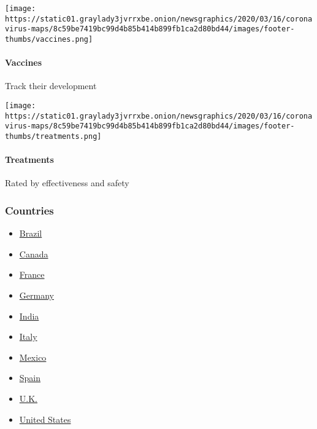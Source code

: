\texttt{[image: https://static01.graylady3jvrrxbe.onion/newsgraphics/2020/03/16/coronavirus-maps/8c59be7419bc99d4b85b414b899fb1ca2d80bd44/images/footer-thumbs/vaccines.png]}

\hypertarget{vaccines}{%
\paragraph{Vaccines}\label{vaccines}}

Track their development

\href{https://www.nytimes3xbfgragh.onion/interactive/2020/science/coronavirus-drugs-treatments.html}{}

\texttt{[image: https://static01.graylady3jvrrxbe.onion/newsgraphics/2020/03/16/coronavirus-maps/8c59be7419bc99d4b85b414b899fb1ca2d80bd44/images/footer-thumbs/treatments.png]}

\hypertarget{treatments}{%
\paragraph{Treatments}\label{treatments}}

Rated by effectiveness and safety

\hypertarget{countries}{%
\subsubsection{Countries}\label{countries}}

\begin{itemize}
\tightlist
\item
  \href{https://www.nytimes3xbfgragh.onion/interactive/2020/world/americas/brazil-coronavirus-cases.html}{Brazil}
\item
  \href{https://www.nytimes3xbfgragh.onion/interactive/2020/world/canada/canada-coronavirus-cases.html}{Canada}
\item
  \href{https://www.nytimes3xbfgragh.onion/interactive/2020/world/europe/france-coronavirus-cases.html}{France}
\item
  \href{https://www.nytimes3xbfgragh.onion/interactive/2020/world/europe/germany-coronavirus-cases.html}{Germany}
\item
  \href{https://www.nytimes3xbfgragh.onion/interactive/2020/world/asia/india-coronavirus-cases.html}{India}
\item
  \href{https://www.nytimes3xbfgragh.onion/interactive/2020/world/europe/italy-coronavirus-cases.html}{Italy}
\item
  \href{https://www.nytimes3xbfgragh.onion/interactive/2020/world/americas/mexico-coronavirus-cases.html}{Mexico}
\item
  \href{https://www.nytimes3xbfgragh.onion/interactive/2020/world/europe/spain-coronavirus-cases.html}{Spain}
\item
  \href{https://www.nytimes3xbfgragh.onion/interactive/2020/world/europe/united-kingdom-coronavirus-cases.html}{U.K.}
\item
  \href{https://www.nytimes3xbfgragh.onion/interactive/2020/us/coronavirus-us-cases.html}{United
  States}
\end{itemize}

